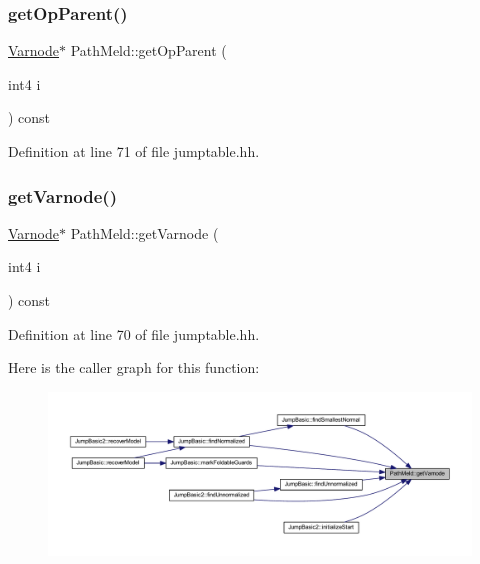 \subsubsection{\texorpdfstring{getOpParent()}{getOpParent()}}
{\footnotesize\ttfamily \mbox{\hyperlink{class_varnode}{Varnode}}$\ast$ Path\+Meld\+::get\+Op\+Parent (\begin{DoxyParamCaption}\item[{int4}]{i }\end{DoxyParamCaption}) const\hspace{0.3cm}{\ttfamily [inline]}}



Definition at line 71 of file jumptable.\+hh.

\mbox{\label{class_path_meld_a884fd25c249e5b270d91a7856f57a88e}} 
\subsubsection{\texorpdfstring{getVarnode()}{getVarnode()}}
{\footnotesize\ttfamily \mbox{\hyperlink{class_varnode}{Varnode}}$\ast$ Path\+Meld\+::get\+Varnode (\begin{DoxyParamCaption}\item[{int4}]{i }\end{DoxyParamCaption}) const\hspace{0.3cm}{\ttfamily [inline]}}



Definition at line 70 of file jumptable.\+hh.

Here is the caller graph for this function\+:
\nopagebreak
\begin{figure}[H]
\begin{center}
\leavevmode
\includegraphics[width=350pt]{class_path_meld_a884fd25c249e5b270d91a7856f57a88e_icgraph}
\end{center}
\end{figure}
\mbox{\label{class_path_meld_a62b0bd2c4340c6f116bdcde53fb23aad}} 
